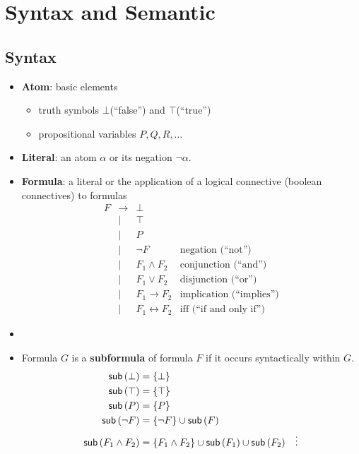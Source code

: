 
\cite{youtube:COSE419-Lecture4-1}

\section{Syntax and Semantic}
\subsection{Syntax}
\begin{itemize}
	\item \textbf{Atom}: basic elements
	\begin{itemize}
		\item truth symbols $\bot$(``false'') and $\top$(``true'')
		\item propositional variables $P,Q,R,\dots$
	\end{itemize}
	\item \textbf{Literal}: an atom $\alpha$ or its negation $\lnot\alpha$.
	\item \textbf{Formula}: a literal or the application of a logical connective (boolean connectives) to formulas
	\[
	\begin{array}{ccll}
		F & \to & \bot \\
		& | & \top \\
		& | & P \\
		& | & \lnot F & \text{negation (``not'')} \\
		& | & F_1\land F_2 & \text{conjunction (``and'')} \\
		& | & F_1\lor F_2 & \text{disjunction (``or'')} \\
		& | & F_1\to F_2 & \text{implication (``implies'')} \\
		& | & F_1\leftrightarrow F_2 & \text{iff (``if and only if'')}
	\end{array}
	\]
	\item[]
	\item Formula $G$ is a \textbf{subformula} of formula $F$ if it occurs syntactically within $G$.
	\begin{align*}
		\textsf{sub}\left(\bot\right) &= \set{\bot} \\
		\textsf{sub}\left(\top\right) &= \set{\top} \\
		\textsf{sub}\left(P\right) &= \set{P} \\
		\textsf{sub}\left(\lnot F\right) &= \set{\lnot F}\cup\textsf{sub}\left(F\right) \\
		\textsf{sub}\left(F_1\land F_2\right) &= \set{F_1\land F_2}\cup\textsf{sub}\left(F_1\right)\cup\textsf{sub}\left(F_2\right)
		&\vdots
	\end{align*}

\end{itemize}
